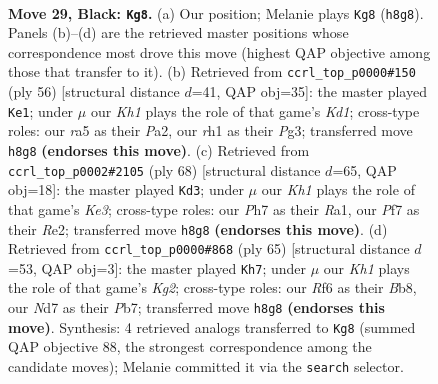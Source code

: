 \documentclass[11pt]{article}
\begin{document}
\clearpage

\begin{figure}[p]\centering
\begin{subfigure}{0.46\textwidth}\centering
\resizebox{\linewidth}{!}{%
\newchessgame
\chessboard[
  setfen={7k/1b1n1p1p/5rp1/R2Pp3/1p2P3/1r3PP1/4K2P/6NR b - - 1 29},
  showmover=false,
  pgfstyle=straightmove, color=movearrow, markmove={h8-g8}
]}
\caption{}
\end{subfigure}\hfill
\begin{subfigure}{0.46\textwidth}\centering
\resizebox{\linewidth}{!}{%
\newchessgame
\chessboard[
  setfen={3n2k1/2r5/1pp1pr1p/p2p4/3P3R/2PN2P1/PP2RP2/3K4 w - - 0 29},
  showmover=false,
  pgfstyle=straightmove, color=movearrow, markmove={d1-e1}
]}
\caption{}
\end{subfigure}
\\[4pt]
\begin{subfigure}{0.46\textwidth}\centering
\resizebox{\linewidth}{!}{%
\newchessgame
\chessboard[
  setfen={8/r4p1k/1n2p3/p2pP1p1/PprP4/1N2K2P/1P2R1P1/R7 w - - 0 35},
  showmover=false,
  pgfstyle=straightmove, color=movearrow, markmove={e3-d3}
]}
\caption{}
\end{subfigure}\hfill
\begin{subfigure}{0.46\textwidth}\centering
\resizebox{\linewidth}{!}{%
\newchessgame
\chessboard[
  setfen={1b6/1p3pk1/5p2/r2p1N1p/p3r3/P1P3P1/1P1R3P/1K3R2 b - - 2 33},
  showmover=false,
  pgfstyle=straightmove, color=movearrow, markmove={g7-h7}
]}
\caption{}
\end{subfigure}
\caption{\textbf{Move 29, Black: \texttt{Kg8}.} (a) Our position; Melanie plays \texttt{Kg8} (\texttt{h8g8}). Panels (b)--(d) are the retrieved master positions whose correspondence most drove this move (highest QAP objective among those that transfer to it). (b) Retrieved from \texttt{ccrl\_top\_p0000\#150} (ply 56) [structural distance $d$=41, QAP obj=35]: the master played \texttt{Ke1}; under $\mu$ our \emph{Kh1} plays the role of that game's \emph{Kd1}; cross-type roles: our \emph{r}a5 as their \emph{P}a2, our \emph{r}h1 as their \emph{P}g3; transferred move \texttt{h8g8} \textbf{(endorses this move)}. (c) Retrieved from \texttt{ccrl\_top\_p0002\#2105} (ply 68) [structural distance $d$=65, QAP obj=18]: the master played \texttt{Kd3}; under $\mu$ our \emph{Kh1} plays the role of that game's \emph{Ke3}; cross-type roles: our \emph{P}h7 as their \emph{R}a1, our \emph{P}f7 as their \emph{R}e2; transferred move \texttt{h8g8} \textbf{(endorses this move)}. (d) Retrieved from \texttt{ccrl\_top\_p0000\#868} (ply 65) [structural distance $d$=53, QAP obj=3]: the master played \texttt{Kh7}; under $\mu$ our \emph{Kh1} plays the role of that game's \emph{Kg2}; cross-type roles: our \emph{R}f6 as their \emph{B}b8, our \emph{N}d7 as their \emph{P}b7; transferred move \texttt{h8g8} \textbf{(endorses this move)}. Synthesis: 4 retrieved analogs transferred to \texttt{Kg8} (summed QAP objective 88, the strongest correspondence among the candidate moves); Melanie committed it via the \texttt{search} selector.}
\label{fig:thought-m57}
\end{figure}
\end{document}
